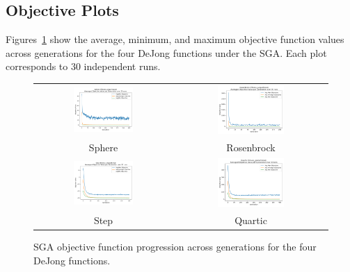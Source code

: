 \documentclass[11pt]{article}
\begin{document}
\subsection{Objective Plots}
Figures~\ref{fig:objective-plots} show the average, minimum, and maximum objective function values across generations for the four DeJong functions under the SGA. Each plot corresponds to 30 independent runs.

\begin{figure}[H]
    \centering
    \begin{tabular}{cc}
        \includegraphics[width=0.45\textwidth]{plots/sphere_fitness_proportional_objective.png} &
        \includegraphics[width=0.45\textwidth]{plots/rosenbrock_fitness_proportional_objective.png} \\
        Sphere & Rosenbrock \\
        \includegraphics[width=0.45\textwidth]{plots/step_fitness_proportional_objective.png} &
        \includegraphics[width=0.45\textwidth]{plots/quartic_fitness_proportional_objective.png} \\
        Step & Quartic \\
    \end{tabular}
    \caption{SGA objective function progression across generations for the four DeJong functions.}
    \label{fig:objective-plots}
\end{figure}
\clearpage
\end{document}
